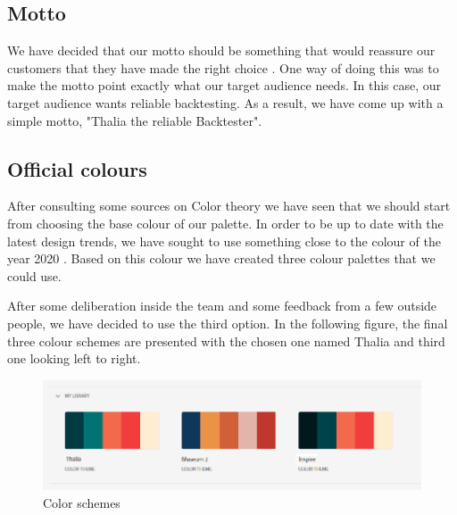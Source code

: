 \documentclass[main.tex]{subfiles}
\begin{document}
\subsection{Motto}
We have decided that our motto should be something that would reassure our customers that they have made the right choice \cite{motto_creation}. One way of doing this was to make the motto point exactly what our target audience needs. In this case, our target audience wants reliable backtesting. As a result, we have come up with a simple motto, "Thalia the reliable Backtester".



\subsection{Official colours} 
 After consulting some sources on Color theory \cite{how_to_color_palette} we have seen that we should start from choosing the base colour of our palette. In order to be up to date with the latest design trends, we have sought to use something close to the colour of the year 2020 \cite{pantone}. Based on this colour we have created three colour palettes that we could use.

After some deliberation inside the team and some feedback from a few outside people, we have decided to use the third option.      
In the following figure, the final three colour schemes are presented with the chosen one named Thalia and third one looking left to right.

\begin{figure}[H]
    \caption{Color schemes \cite{TR}}
    \includegraphics[width=\textwidth]{03Branding/Pictures/color_schemes.png}
\end{figure}
\end{document}
